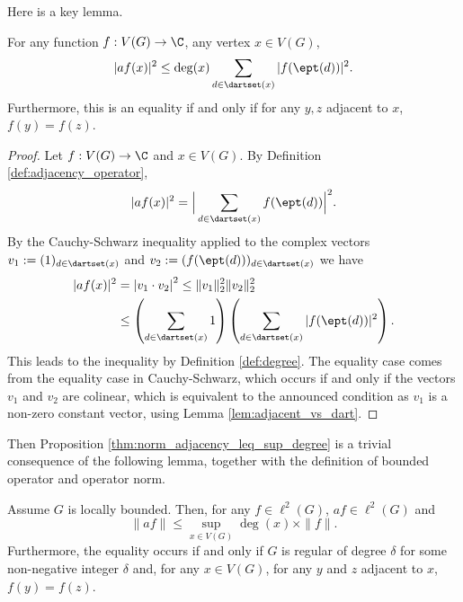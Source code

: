 Here is a key lemma.

\begin{lemma}
  \label{lem:bound_a_degree_x}
  For any function $f : V(G) \rightarrow \C$, any vertex $x \in V(G)$,
  \begin{equation}
    |af(x)|^2
    \leq \deg(x)
    \sum_{d \in \dartset(x)} |f(\ept(d))|^2.
  \end{equation}
  Furthermore, this is an equality if and only if
  for any $y, z$ adjacent to $x$, $f(y) = f(z)$.
\end{lemma}

\begin{proof}
  Let $f : V(G) \rightarrow \C$ and $x \in V(G)$.
  By Definition \ref{def:adjacency_operator},
  \begin{equation}
    |af(x)|^2
    = \Big| \sum_{d \in \dartset(x)} f(\ept(d))\Big|^2.
  \end{equation}
  By the Cauchy-Schwarz inequality applied to the complex vectors
  $v_1 := (1)_{d \in \dartset(x)}$ and $v_2 := (f(\ept(d)))_{d \in \dartset(x)}$
  we have
  \begin{align*}
    |af(x)|^2
    & = \left| v_1 \cdot v_2 \right|^2
    \leq \|v_1\|_2^2 \|v_2\|_2^2 \\
    &\leq
    \left( \sum_{d \in \dartset(x)} 1
    \right)
    \left( \sum_{d \in \dartset(x)} |f(\ept(d))|^2
    \right).
  \end{align*}
  This leads to the inequality by Definition \ref{def:degree}.
  The equality case comes from the equality case in Cauchy-Schwarz, which occurs if
  and only if the vectors $v_1$ and $v_2$
  are colinear, which
  is equivalent to the announced condition as $v_1$ is a non-zero constant vector,
  using Lemma \ref{lem:adjacent_vs_dart}.
\end{proof}

Then Proposition \ref{thm:norm_adjacency_leq_sup_degree} is a trivial consequence of the
following lemma, together with the definition of bounded operator and operator norm.

\begin{lemma}
  \label{lem:bound_a_sup_degree}
  Assume $G$ is locally bounded. Then, for any $f \in \ell^2(G)$,
  $a f \in \ell^2(G)$ and
  \begin{equation}
    \|a f\| \leq \sup_{x \in V(G)} \deg(x) \times \|f\|.
  \end{equation}
  Furthermore, the equality occurs if and only if $G$ is regular of degree $\delta$ for some
  non-negative integer $\delta$
  and, for any $x \in V(G)$, for any $y$ and $z$ adjacent to $x$, $f(y)=f(z)$.
\end{lemma}

